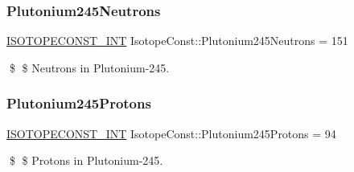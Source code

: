 \subsubsection{\texorpdfstring{Plutonium245\+Neutrons}{Plutonium245Neutrons}}
{\footnotesize\ttfamily \mbox{\hyperlink{group___isotope_const-_macros_ga5f18360b3e99483a35c32d789e62621c}{I\+S\+O\+T\+O\+P\+E\+C\+O\+N\+S\+T\+\_\+\+I\+NT}} Isotope\+Const\+::\+Plutonium245\+Neutrons = 151}

\$ \$ Neutrons in Plutonium-\/245. \mbox{\label{group___isotope_const-_plutonium-_pu245_gae8846e6f3abb606f59b4e61a83b9c367}} 
\subsubsection{\texorpdfstring{Plutonium245\+Protons}{Plutonium245Protons}}
{\footnotesize\ttfamily \mbox{\hyperlink{group___isotope_const-_macros_ga5f18360b3e99483a35c32d789e62621c}{I\+S\+O\+T\+O\+P\+E\+C\+O\+N\+S\+T\+\_\+\+I\+NT}} Isotope\+Const\+::\+Plutonium245\+Protons = 94}

\$ \$ Protons in Plutonium-\/245. 